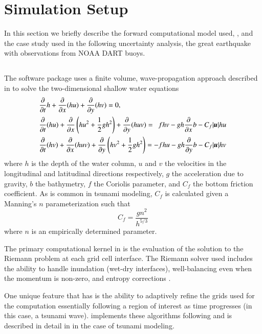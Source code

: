 
\section{Simulation Setup}

In this section we briefly describe the forward computational model used, \geoclaw, and the case study used in the following uncertainty analysis, the great \tohoku earthquake with observations from NOAA DART buoys.

\subsection{\geoclaw} \label{ssub:geoclaw}

The \geoclaw software package uses a finite volume, wave-propagation approach described in \cite{LeVeque:1997eg} to solve the two-dimensional shallow water equations
\begin{equation} \label{eq:swe}
    \begin{aligned}
    &\pd{}{t} h + \pd{}{x} (hu) + \pd{}{y} (hv) = 0, \\
    &\pd{}{t}(hu) + \pd{}{x} \left(hu^2 + \frac{1}{2} g h^2 \right ) + \pd{}{y} (huv) = ~~ fhv - gh \pd{}{x} b - C_f |\vec{u}| hu \\
    &\pd{}{t} (hv) + \pd{}{x} (huv) + \pd{}{y} \left (hv^2 + \frac{1}{2} gh^2 \right) = -fhu - gh \pd{}{y} b - C_f |\vec{u}| hv
    \end{aligned}
\end{equation}
where $h$ is the depth of the water column, $u$ and $v$ the velocities in the longitudinal and latitudinal directions respectively, $g$ the acceleration due to gravity, $b$ the bathymetry, $f$ the Coriolis parameter, and $C_f$ the bottom friction coefficient.  As is common in tsunami modeling, $C_f$ is calculated given a Manning's $n$ parameterization such that
\begin{equation}
    C_f = \frac{g n^2}{h^{5/3}}
\end{equation}
where $n$ is an empirically determined parameter.  

The primary computational kernel in \geoclaw is the evaluation of the solution to the Riemann problem at each grid cell interface.  The Riemann solver used includes the ability to handle inundation (wet-dry interfaces), well-balancing even when the momentum is non-zero, and entropy corrections \cite{George:2008aa}.

One unique feature that \geoclaw has is the ability to adaptively refine the grids used for the computation essentially following a region of interest as time progresses (in this case, a tsunami wave).  \geoclaw implements these algorithms following \cite{Berger:1984ui,Berger:1998aa} and is described in detail in \cite{Berger:2011du} in the case of tsunami modeling.

